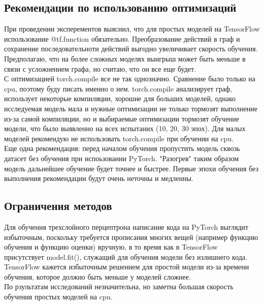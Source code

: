 \documentclass[a4paper,12pt,titlepage,final]{article}
\begin{document}
\begin{center}
    \item \subsection{Рекомендации по использованию оптимизаций}
\end{center}

При проведении эксперементов выяснил, что для простых моделей на TensorFlow использование @tf.function обязательно. Преобразование действий в граф и сохранение последовательноти действий выгодно увеличивает скорость обучения. Предполагаю, что на более сложных моделях выигрыш может быть меньше в связи с усложнением графа, но считаю, что он все еще будет.\\

С оптимизацией torch.compile все не так однозначно. Сравнение было только на cpu, поэтому буду писать именно о нем. torch.compile анализирует граф, использует некоторые компиляции, хорошие для больших моделей, однако исследуемая модель мала и нужные оптимизации не только тормозят выполнение из-за самой компиляции, но и выбираемые оптимизации тормозят обучение модели, что было выявленно на всех испытаних (10, 20, 30 эпох). Для малых моделей рекомендую не использовать torch.compile при обучении на cpu.\\

Еще одна рекомендация: перед началом обучения пропустить модель сквозь датасет без обучения при испоьзовании PyTorch. "Разогрев" таким образом модель дальнейшее обучение будет точнее и быстрее. Первые эпохи обучения без выполнения рекомендации будут очень неточны и медленны.

\begin{center}
    \item \subsection{Ограничения методов}
\end{center}

Для обучения трехслойного перцептрона написание кода на PyTorch выглядит избыточным, поскольку требуется прописания многих вещей (например функцию обучения и функцию оценки) вручную, в то время как в TensorFlow присутствует model.fit(), служащий для обучения модели без излишнего кода.\\

TensorFlow кажется избыточным решением для простой модели из-за времени обучения, которое должно быть меньше у моделей сложнее.\\

По рзультатам исследований незначительна, но заметна большая скорость обучения простых моделей на cpu.\\
\end{document}
